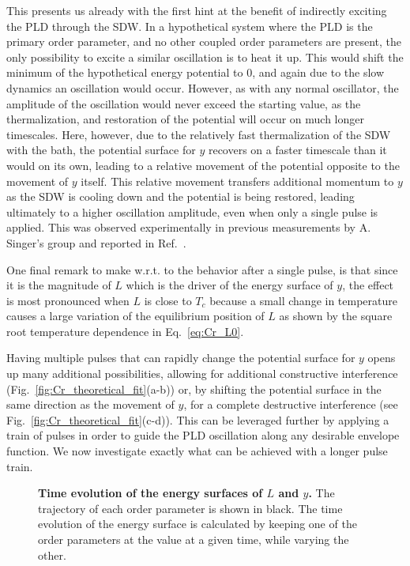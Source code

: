 This presents us already with the first hint at the benefit of indirectly exciting the PLD through the SDW.
In a hypothetical system where the PLD is the primary order parameter, and no other coupled order parameters are present, the only possibility to excite a similar oscillation is to heat it up.
This would shift the minimum of the hypothetical energy potential to 0, and again due to the slow dynamics an oscillation would occur.
However, as with any normal oscillator, the amplitude of the oscillation would never exceed the starting value, as the thermalization, and restoration of the potential will occur on much longer timescales.
Here, however, due to the relatively fast thermalization of the SDW with the bath, the potential surface for $y$ recovers on a faster timescale than it would on its own, leading to a relative movement of the potential opposite to the movement of $y$ itself.
This relative movement transfers additional momentum to $y$ as the SDW is cooling down and the potential is being restored, leading ultimately to a higher oscillation amplitude, even when only a single pulse is applied.
This was observed experimentally in previous measurements by A. Singer's group and reported in Ref.~\cite{Singer2015prl}. 

One final remark to make w.r.t. to the behavior after a single pulse, is that since it is the magnitude of $L$ which is the driver of the energy surface of $y$, the effect is most pronounced when $L$ is close to $T_c$ because a small change in temperature causes a large variation of the equilibrium position of $L$ as shown by the square root temperature dependence in Eq.~\ref{eq:Cr_L0}.    

Having multiple pulses that can rapidly change the potential surface for $y$ opens up many additional possibilities, allowing for additional constructive interference (Fig.~\ref{fig:Cr_theoretical_fit}(a-b)) or, by shifting the potential surface in the same direction as the movement of $y$, for a complete destructive interference (see Fig.~\ref{fig:Cr_theoretical_fit}(c-d)).
This can be leveraged further by applying a train of pulses in order to guide the PLD oscillation along any desirable envelope function.
We now investigate exactly what can be achieved with a longer pulse train.
\begin{figure}
	\begin{subfigure}{0.5\textwidth}
	\end{subfigure}
	\begin{subfigure}{0.5\textwidth}
	\end{subfigure}
	\caption{\label{fig:Cr_energy_surfaces}{\bf Time evolution of the energy surfaces of $L$ and $y$.} The trajectory of each order parameter is shown in black. The time evolution of the energy surface is calculated by keeping one of the order parameters at the value at a given time, while varying the other.}
\end{figure}

